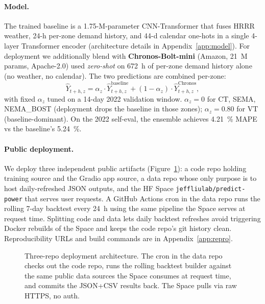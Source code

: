 \paragraph{Model.}
The trained baseline is a 1.75-M-parameter CNN-Transformer that fuses
HRRR weather, 24-h per-zone demand history, and 44-d calendar one-hots
in a single 4-layer Transformer encoder (architecture details in
Appendix~\ref{app:model}). For deployment we additionally blend with
\textbf{Chronos-Bolt-mini} \citep{ansari2024chronos} (Amazon, 21~M
params, Apache-2.0) used \emph{zero-shot} on 672~h of per-zone demand
history alone (no weather, no calendar). The two predictions are
combined per-zone:
\begin{equation}
\hat Y_{t+h, z} = \alpha_z \cdot \hat Y^{\text{baseline}}_{t+h, z}
+ (1 - \alpha_z) \cdot \hat Y^{\text{Chronos}}_{t+h, z},
\label{eq:ensemble}
\end{equation}
with fixed $\alpha_z$ tuned on a 14-day 2022 validation window.
$\alpha_z = 0$ for CT, SEMA, NEMA\_BOST (deployment drops the baseline
in those zones); $\alpha_z = 0.80$ for VT (baseline-dominant). On the
2022 self-eval, the ensemble achieves 4.21~\% MAPE vs the baseline's
5.24~\%.

\paragraph{Public deployment.}
We deploy three independent public artifacts (Figure~\ref{fig:3repo}):
a code repo holding training source and the Gradio app source, a data
repo whose only purpose is to host daily-refreshed JSON outputs, and
the HF Space \texttt{jeffliulab/predict-power} that serves user
requests. A GitHub Actions cron in the data repo runs the rolling
7-day backtest every 24~h using the same pipeline the Space serves at
request time. Splitting code and data lets daily backtest refreshes
avoid triggering Docker rebuilds of the Space and keeps the code repo's
git history clean. Reproducibility URLs and build commands are in
Appendix~\ref{app:repro}.

\begin{figure}[h]
\centering

\caption{Three-repo deployment architecture.
The cron in the data repo checks out the code repo, runs the rolling
backtest builder against the same public data sources the Space
consumes at request time, and commits the JSON+CSV results back. The
Space pulls via raw HTTPS, no auth.}
\label{fig:3repo}
\end{figure}
